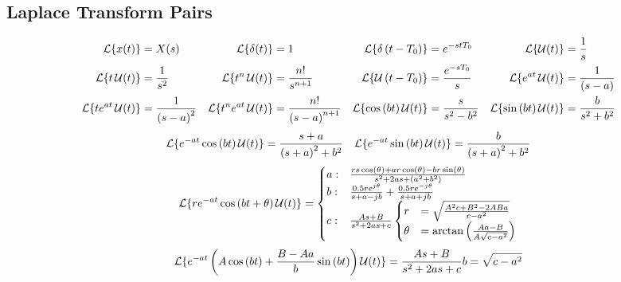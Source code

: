 		\vspace{-5mm}
		
	\subsection*{Laplace Transform Pairs} \label{subsec:Laplace Transform Pairs}
		\begin{align*}
			\operatorname{\mathcal{L}} \lbrace x (t) \rbrace &= X(s) & \operatorname{\mathcal{L}} \lbrace \delta (t) \rbrace &= 1 & \operatorname{\mathcal{L}} \lbrace \delta \left( t-T_{0} \right) \rbrace &= e^{-stT_{0}} & \operatorname{\mathcal{L}} \lbrace \operatorname{\mathcal{U}} (t) \rbrace &= \frac{1}{s} \\
			\operatorname{\mathcal{L}} \lbrace t \operatorname{\mathcal{U}} (t) \rbrace &= \frac{1}{s^{2}} & \operatorname{\mathcal{L}} \lbrace t^{n}\operatorname{\mathcal{U}} (t) \rbrace &= \frac{n!}{s^{n+1}} & \operatorname{\mathcal{L}} \lbrace \operatorname{\mathcal{U}} \left( t-T_{0} \right) \rbrace &= \frac{e^{-sT_{0}}}{s} & \operatorname{\mathcal{L}} \lbrace e^{at} \operatorname{\mathcal{U}} (t) \rbrace &= \frac{1}{\left( s-a \right)} \\
			\operatorname{\mathcal{L}} \lbrace t e^{at} \operatorname{\mathcal{U}} (t) \rbrace &= \frac{1}{\left( s-a \right)^{2}} & \operatorname{\mathcal{L}} \lbrace t^{n} e^{at} \operatorname{\mathcal{U}} (t) \rbrace &= \frac{n!}{\left( s-a \right)^{n+1}} & \operatorname{\mathcal{L}} \lbrace \cos \left( bt \right) \operatorname{\mathcal{U}} (t) \rbrace &= \frac{s}{s^{2}-b^{2}} & \operatorname{\mathcal{L}} \lbrace \sin \left( bt \right) \operatorname{\mathcal{U}} (t) \rbrace &= \frac{b}{s^{2}+b^{2}} \\
		\end{align*}
		\vspace{-8mm}
		\begin{align*}
			\operatorname{\mathcal{L}} \lbrace e^{-at} \cos \left( bt \right) \operatorname{\mathcal{U}} (t) \rbrace &= \frac{s+a}{\left( s+a \right)^{2} + b^{2}} & \operatorname{\mathcal{L}} \lbrace e^{-at} \sin \left( bt \right) \operatorname{\mathcal{U}} (t) \rbrace &= \frac{b}{\left( s+a \right)^{2} + b^{2}} \\
		\end{align*}
		\vspace{-8mm}
		\begin{equation*}
			\operatorname{\mathcal{L}} \lbrace r e^{-at} \cos \left( bt + \theta \right) \operatorname{\mathcal{U}} (t) \rbrace =
				\begin{cases}
					a: & \frac{rs \cos \left( \theta \right) + ar \cos \left( \theta \right) - br \sin \left( \theta \right)}{s^{2} + 2as + \left( a^{2} + b^{2} \right)} \\
					b: & \frac{0.5 re^{j \theta}}{s+a-jb} + \frac{0.5 re^{-j \theta}}{s+a+jb} \\
					c: & \frac{As+B}{s^{2} + 2as + c}
						\begin{cases}
							r &=\sqrt{\frac{A^{2}c + B^{2} -2ABa}{c-a^{2}}} \\
							\theta &= \arctan \left( \frac{Aa-B}{A \sqrt{c-a^{2}}} \right)
						\end{cases} \\
				\end{cases}
		\end{equation*}
		\begin{equation*}
			\operatorname{\mathcal{L}} \lbrace e^{-at} \left( A \cos \left( bt \right) + \frac{B-Aa}{b} \sin \left( bt \right) \right) \operatorname{\mathcal{U}} (t) \rbrace = \frac{As+B}{s^{2} + 2as + c} \\
			b = \sqrt{c-a^{2}}
		\end{equation*}